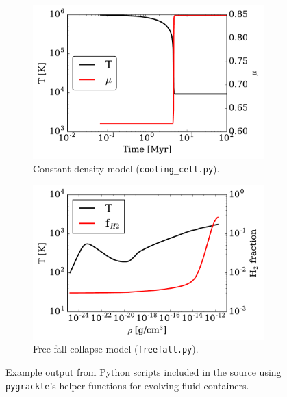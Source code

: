 \begin{figure}
\centering
\begin{subfigure}{.48\textwidth}
  \centering
  \includegraphics[width=0.98\textwidth]{figures/cooling_cell.pdf}
  \caption{Constant density model (\texttt{cooling\_cell.py}).}
  \label{fig:cooling-cell}
\end{subfigure}%
\begin{subfigure}{.48\textwidth}
  \centering
  \includegraphics[width=0.98\textwidth]{figures/freefall.pdf}
  \caption{Free-fall collapse model (\texttt{freefall.py}).}
  \label{fig:freefall}
\end{subfigure}%
\caption{Example output from Python scripts included in the \grackle{}
  source using \texttt{pygrackle}'s helper functions for evolving
  fluid containers.}
\label{fig:evolve}
\vspace*{-1\baselineskip}
\end{figure}


